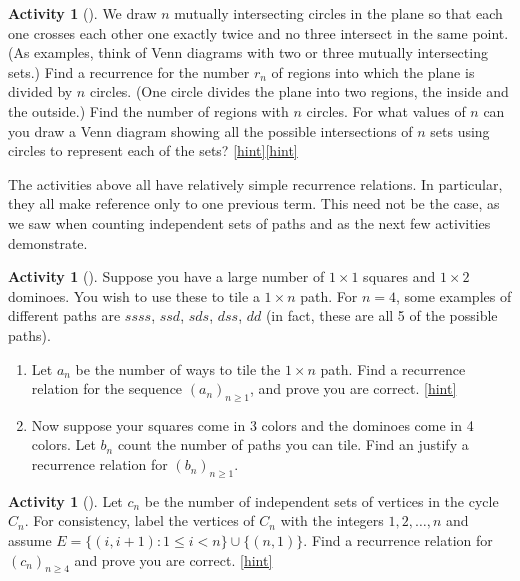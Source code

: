 \documentclass[10pt,]{book}
\theoremstyle{plain}
\theoremstyle{definition}
\theoremstyle{definition}
\theoremstyle{definition}
\newtheorem{activity}[project]{Activity}
\numberwithin{equation}{chapter}
\def\st{:}
\newcommand{\lt}{<}
\begin{document}
\begin{activity}[]\label{circlesinplane}
\hypertarget{p-901}{}%
We draw \(n\) mutually intersecting circles in the plane so that each one crosses each other one exactly twice and no three intersect in the same point. (As examples, think of Venn diagrams with two or three mutually intersecting sets.) Find a recurrence for the number \(r_n\) of regions into which the plane is divided by \(n\) circles. (One circle divides the plane into two regions, the inside and the outside.) Find the number of regions with \(n\) circles. For what values of \(n\) can you draw a Venn diagram showing all the possible intersections of \(n\) sets using circles to represent each of the sets?%
\hfill{\tiny\hyperlink{a-138}{[hint]}\hypertarget{q-138}{}}\hfill{\tiny\hyperlink{a-138}{[hint]}\hypertarget{q-138}{}}\end{activity}
\hypertarget{p-906}{}%
The activities above all have relatively simple recurrence relations.  In particular, they all make reference only to one previous term.  This need not be the case, as we saw when counting independent sets of paths and as the next few activities demonstrate.%
\begin{activity}[]\label{act-dominoes}
\hypertarget{p-907}{}%
Suppose you have a large number of \(1\times 1\) squares and \(1 \times 2\) dominoes.  You wish to use these to tile a \(1 \times n\) path.  For \(n = 4\), some examples of different paths are \(ssss\), \(ssd\), \(sds\), \(dss\), \(dd\) (in fact, these are all 5 of the possible paths).%
\begin{enumerate}[font=\bfseries,label=(\alph*),ref=\alph*]
\item\label{task-171} \hypertarget{p-908}{}%
Let \(a_n\) be the number of ways to tile the \(1 \times n\) path.  Find a recurrence relation for the sequence \((a_n)_{n \ge 1}\), and prove you are correct.%
\hfill{\tiny\hyperlink{a-139.a}{[hint]}\hypertarget{q-139.a}{}}\item\label{task-172} \hypertarget{p-910}{}%
Now suppose your squares come in 3 colors and the dominoes come in 4 colors.  Let \(b_n\) count the number of paths you can tile.  Find an justify a recurrence relation for \((b_n)_{n \ge 1}\).%
\end{enumerate}
\end{activity}
\begin{activity}[]\label{activity-133}
\hypertarget{p-911}{}%
Let \(c_n\) be the number of independent sets of vertices in the cycle \(C_n\).  For consistency, label the vertices of \(C_n\) with the integers \(1, 2, \ldots, n\) and assume \(E = \{(i, i+1) \st 1 \le i \lt n\} \cup \{(n, 1)\}\). Find a recurrence relation for \((c_n)_{n\ge 4}\) and prove you are correct.%
\hfill{\tiny\hyperlink{a-140}{[hint]}\hypertarget{q-140}{}}\end{activity}
\end{document}
